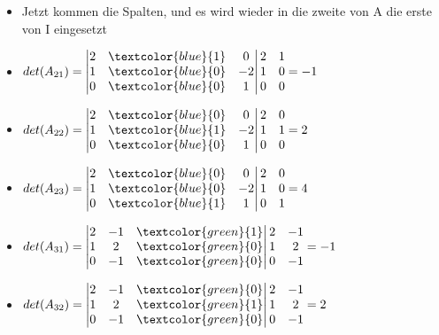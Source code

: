 \documentclass{article}
\begin{document}
\begin{itemize}
\begin{itemize}
\begin{itemize}
				\item{Jetzt kommen die Spalten, und es wird wieder in die zweite von A die erste von I eingesetzt}
				\item{$det(A_{21})=\begin{vmatrix} 2 & \textcolor{blue}{1} & 0 \\ 1 & \textcolor{blue}{0} & -2 \\ 0 & \textcolor{blue}{0} & 1 \end{vmatrix}\begin{matrix} 2 & 1 \\ 1 & 0 \\ 0 & 0 \end{matrix}=-1$}
				\item{$det(A_{22})=\begin{vmatrix} 2 & \textcolor{blue}{0} & 0 \\ 1 & \textcolor{blue}{1} & -2 \\ 0 & \textcolor{blue}{0} & 1 \end{vmatrix}\begin{matrix} 2 & 0 \\ 1 & 1 \\ 0 & 0 \end{matrix}=2$}
				\item{$det(A_{23})=\begin{vmatrix} 2 & \textcolor{blue}{0} & 0 \\ 1 & \textcolor{blue}{0} & -2 \\ 0 & \textcolor{blue}{1} & 1 \end{vmatrix}\begin{matrix} 2 & 0 \\ 1 & 0 \\ 0 & 1 \end{matrix}=4$}
				\item{$det(A_{31})=\begin{vmatrix} 2 & -1 & \textcolor{green}{1} \\ 1 & 2 & \textcolor{green}{0} \\ 0 & -1 & \textcolor{green}{0} \end{vmatrix}\begin{matrix} 2 & -1 \\ 1 & 2 \\ 0 & -1 \end{matrix}=-1$}
				\item{$det(A_{32})=\begin{vmatrix} 2 & -1 & \textcolor{green}{0} \\ 1 & 2 & \textcolor{green}{1} \\ 0 & -1 & \textcolor{green}{0} \end{vmatrix}\begin{matrix} 2 & -1 \\ 1 & 2 \\ 0 & -1 \end{matrix}=2$}

\end{itemize}
\end{itemize}
\end{itemize}
\end{document}
